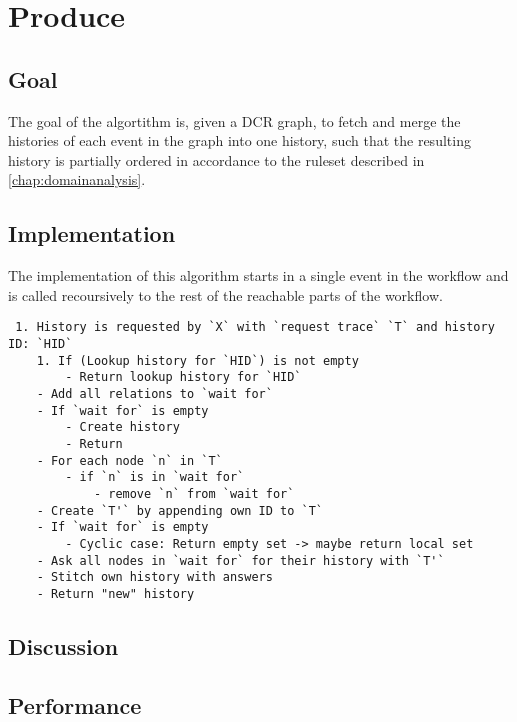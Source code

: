 \section{Produce}
\subsection{Goal} %
The goal of the algortithm is, given a DCR graph, to fetch and merge the histories of each event in the graph into one history, such that the resulting history is partially ordered in accordance to the ruleset described in \ref{chap:domainanalysis}. 


\subsection{Implementation} %
The implementation of this algorithm starts in a single event in the workflow and is called recoursively to the rest of the reachable parts of the workflow.

\begin{lstlisting}
 1. History is requested by `X` with `request trace` `T` and history ID: `HID`
    1. If (Lookup history for `HID`) is not empty
        - Return lookup history for `HID`
    - Add all relations to `wait for`
    - If `wait for` is empty
        - Create history
        - Return
    - For each node `n` in `T`
        - if `n` is in `wait for`
            - remove `n` from `wait for`
    - Create `T'` by appending own ID to `T`
    - If `wait for` is empty
        - Cyclic case: Return empty set -> maybe return local set
    - Ask all nodes in `wait for` for their history with `T'`
    - Stitch own history with answers
    - Return "new" history
\end{lstlisting}

\subsection{Discussion} %
\subsection{Performance} %